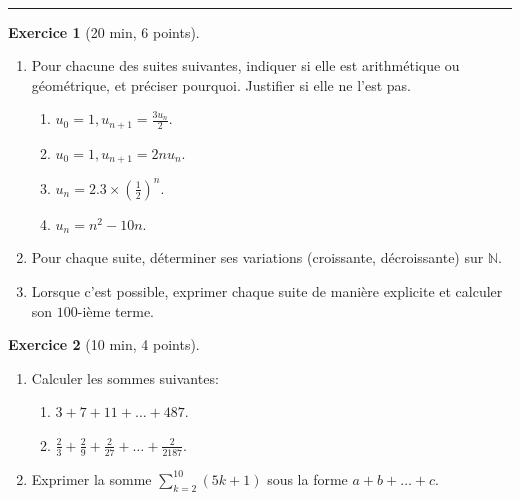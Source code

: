 \documentclass{exam}
\theoremstyle{definition}
\newtheorem{exercice}{Exercice}
\begin{document}
\Large



~\\



\medskip\hrule

\begin{exercice}[20 min, 6 points]
    \begin{enumerate}
        \item Pour chacune des suites suivantes, indiquer si elle est arithmétique ou géométrique, et préciser pourquoi. Justifier si elle ne l’est pas.
        \begin{enumerate}
            \item $u_0 = 1, u_{n+1} = \frac{3 u_n}{2}$.
            \item $u_0 = 1, u_{n+1} = 2nu_n$.
            \item $u_n = 2.3 \times (\frac{1}{2})^n$.
            \item $u_n = n^2 - 10n$.
        \end{enumerate}
        \item Pour chaque suite, déterminer ses variations (croissante, décroissante) sur $\mathbb{N}$.
        \item Lorsque c'est possible, exprimer chaque suite de manière explicite et calculer son $100$-ième terme.
    \end{enumerate}
\end{exercice}

\vfill

\begin{exercice}[10 min, 4 points]
\begin{enumerate}
    \item Calculer les sommes suivantes:
    \begin{enumerate}
        \item $3+7+11+\dots+487$.
        \item $\frac{2}{3}+\frac{2}{9}+\frac{2}{27}+\dots+\frac{2}{2187}$.
    \end{enumerate}
    \item Exprimer la somme $\sum_{k=2}^{10}(5k+1)$ sous la forme $a+b+\dots+c$.
\end{enumerate}

\vfill
    
\end{exercice}
\end{document}
